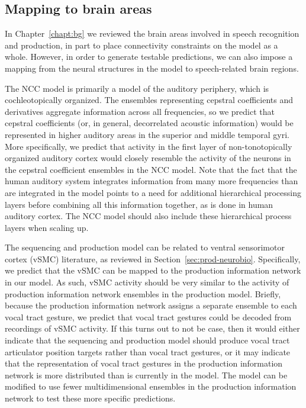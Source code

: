 \subsection{Mapping to brain areas}

In Chapter~\ref{chapt:bg}
we reviewed the brain areas
involved in speech recognition and production,
in part to place connectivity constraints
on the model as a whole.
However, in order to generate testable predictions,
we can also impose a mapping from
the neural structures in the model
to speech-related brain regions.

The NCC model is primarily a model
of the auditory periphery,
which is cochleotopically organized.
The ensembles representing
cepstral coefficients and derivatives
aggregate information across
all frequencies,
so we predict that cepstral coefficients
(or, in general, decorrelated acoustic information)
would be represented
in higher auditory areas in the
superior and middle temporal gyri.
More specifically,
we predict that activity in the
first layer of non-tonotopically organized
auditory cortex would
closely resemble the activity of
the neurons in the cepstral coefficient
ensembles in the NCC model.
Note that the fact that the
human auditory system integrates information
from many more frequencies than
are integrated in the model
points to a need for additional
hierarchical processing layers
before combining all this information together,
as is done in human auditory cortex.
The NCC model should also
include these hierarchical process layers
when scaling up.

The sequencing and production model
can be related to
ventral sensorimotor cortex (vSMC) literature,
as reviewed in Section~\ref{sec:prod-neurobio}.
Specifically, we predict that
the vSMC can be mapped to the
production information network in our model.
As such, vSMC activity should be very similar
to the activity of production information network
ensembles in the production model.
Briefly, because the production information network
assigns a separate ensemble to each
vocal tract gesture, we predict that
vocal tract gestures could be decoded
from recordings of vSMC activity.
If this turns out to not be case,
then it would either indicate that
the sequencing and production model
should produce vocal tract articulator position targets
rather than vocal tract gestures,
or it may indicate that the representation
of vocal tract gestures
in the production information network
is more distributed than is currently in the model.
The model can be modified to use
fewer multidimensional ensembles
in the production information network to test
these more specific predictions.

